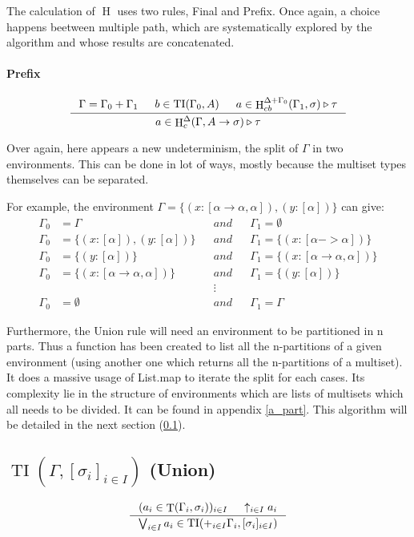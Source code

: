 \documentclass{article}
\DeclareMathOperator{\iT}{T}
\DeclareMathOperator{\iH}{H}
\DeclareMathOperator{\iTI}{TI}
\begin{document}
The calculation of $\iH$ uses two rules, Final and Prefix. Once again, a choice happens beetween multiple path, which are systematically explored by the algorithm and whose results are concatenated. 

\paragraph{Prefix}
\begin{displaymath}
\inference[]{\Gamma = \Gamma_0 + \Gamma_1 & b \in \iTI(\Gamma_0, A) & a \in \iH^{\Delta + \Gamma_0}_{cb}(\Gamma_1, \sigma) \triangleright \tau}{a \in \iH^{\Delta}_c(\Gamma, A \rightarrow \sigma) \triangleright \tau}
\end{displaymath}

Over again, here appears a new undeterminism, the split of $\Gamma$ in two environments. This can be done in lot of ways, mostly because the multiset types themselves can be separated.

For example, the environment $\Gamma = \{(x : [\alpha \rightarrow \alpha, \alpha]), (y : [\alpha])\}$ can give:
\begin{align*}
   \Gamma_0 &= \Gamma &&and&& \Gamma_1 = \emptyset
   \\\Gamma_0 &= \{(x:[\alpha]), (y:[\alpha])\} &&and&& \Gamma_1 = \{(x:[\alpha -> \alpha])\}
   \\\Gamma_0 &= \{(y:[\alpha])\} &&and&& \Gamma_1 = \{(x : [\alpha \rightarrow \alpha, \alpha])\}
   \\\Gamma_0 &= \{(x : [\alpha \rightarrow \alpha, \alpha])\} &&and&& \Gamma_1 = \{(y:[\alpha])\}
   \\&&&\vdots&&
   \\\Gamma_0 &= \emptyset &&and&& \Gamma_1 = \Gamma
\end{align*}

Furthermore, the Union rule will need an environment to be partitioned in n parts. Thus a function has been created to list all the n-partitions of a given environment (using another one which returns all the n-partitions of a multiset). It does a massive usage of List.map to iterate the split for each cases. Its complexity lie in the structure of environments which are lists of multisets which all needs to be divided. It can be found in appendix \ref{a_part}. This algorithm will be detailed in the next section (\ref{ss_ti}).

\subsection{$\iTI(\Gamma, [\sigma_i]_{i \in I})$ (Union)}
\label{ss_ti}
\begin{displaymath}
    \inference[]{(a_i \in \iT(\Gamma_i, \sigma_i))_{i \in I} & \uparrow_{i \in I}a_i}{ \bigvee_{i \in I} a_i \in \iTI(+_{i \in I}\Gamma_i, [\sigma_i]_{i \in I}) }
\end{displaymath}
\end{document}

